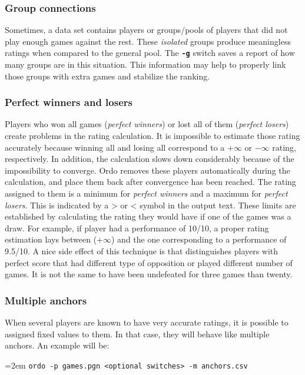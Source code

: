 \documentclass[12pt]{article}
\newcommand{\swtch} [1] {\texttt{\textbf{#1}}}
\newcommand{\cmdln}[1]{
	\par
	\begingroup
		\leftskip=2em
		\addtolength{\rightskip}{0em}
		\noindent \small{\texttt{#1}}
		\par
	\endgroup
}
\begin{document}
\subsubsection*{Group connections}

Sometimes, a data set contains players or groups/pools of players that did not play enough games against the rest. 
These \textit{isolated} groups produce meaningless ratings when compared to the general pool. 
The \swtch{-g} switch saves a report of how many groups are in this situation.
This information may help to properly link those groups with extra games and stabilize the ranking.

\subsubsection*{Perfect winners and losers}

Players who won all games (\textit{perfect winners}) or lost all of them (\textit{perfect losers}) create problems in the rating calculation.
It is impossible to estimate those rating accurately because winning all and losing all correspond to a $+\infty$ or $-\infty$ rating, respectively.
In addition, the calculation slows down considerably because of the impossibility to converge.
Ordo removes these players automatically during the calculation, and place them back after convergence has been reached.
The rating assigned to them is a minimum for \textit{perfect winners} and a maximum for \textit{perfect losers}.
This is indicated by a > or < symbol in the output text.
These limits are established by calculating the rating they would have if one of the games was a draw.
For example, if player had a performance of 10/10, a proper rating estimation lays between ($+\infty$) and the one corresponding to a performance of 9.5/10.
A nice side effect of this technique is that distinguishes players with perfect score that had different type of opposition or played different number of games.
It is not the same to have been undefeated for three games than twenty.
 
\subsubsection*{Multiple anchors}

When several players are known to have very accurate ratings, it is possible to assigned fixed values to them.
In that case, they will behave like multiple anchors. An example will be:

\cmdln{ordo -p games.pgn <optional switches> -m anchors.csv}
\end{document}
